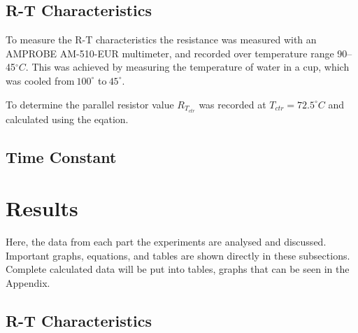 \documentclass[a4,11pt]{article}
\begin{document}
\subsection{R-T Characteristics}

To measure the R-T characteristics the resistance was measured with an AMPROBE AM-510-EUR multimeter, and recorded over temperature range 90--45$^{\circ}C$. This was achieved by measuring the temperature of water in a cup, which was cooled from$~100^{\circ}$ to$~45^{\circ}$.

To determine the parallel resistor value $R_{T_{ctr}}$ was recorded at $T_{ctr}=72.5^{\circ}C$ and calculated using the eqation.
\subsection{Time Constant}
\section{Results}
Here, the data from each part the experiments are analysed and discussed. Important graphs, equations, and tables are shown directly in these subsections. Complete calculated data will be put into tables, graphs that can be seen in the Appendix.
\subsection{R-T Characteristics}
\end{document}
